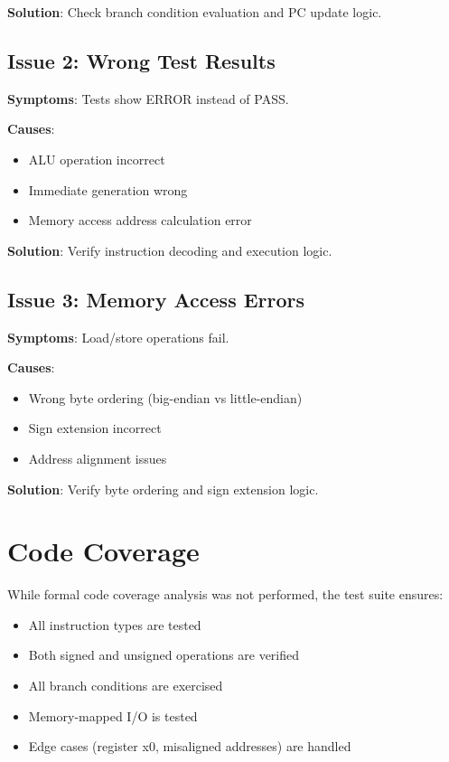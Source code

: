 \textbf{Solution}: Check branch condition evaluation and PC update logic.

\subsection{Issue 2: Wrong Test Results}

\textbf{Symptoms}: Tests show ERROR instead of PASS.

\textbf{Causes}:
\begin{itemize}
    \item ALU operation incorrect
    \item Immediate generation wrong
    \item Memory access address calculation error
\end{itemize}

\textbf{Solution}: Verify instruction decoding and execution logic.

\subsection{Issue 3: Memory Access Errors}

\textbf{Symptoms}: Load/store operations fail.

\textbf{Causes}:
\begin{itemize}
    \item Wrong byte ordering (big-endian vs little-endian)
    \item Sign extension incorrect
    \item Address alignment issues
\end{itemize}

\textbf{Solution}: Verify byte ordering and sign extension logic.

\section{Code Coverage}

While formal code coverage analysis was not performed, the test suite ensures:

\begin{itemize}
    \item All instruction types are tested
    \item Both signed and unsigned operations are verified
    \item All branch conditions are exercised
    \item Memory-mapped I/O is tested
    \item Edge cases (register x0, misaligned addresses) are handled
\end{itemize}

